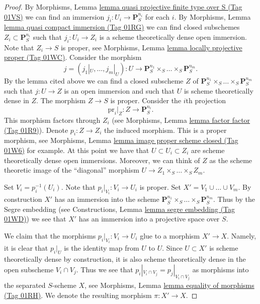 \documentclass{amsart}
\theoremstyle{plain}
\theoremstyle{definition}
\theoremstyle{remark}
\numberwithin{equation}{subsection}
\begin{document}
\begin{proof}
\medskip\noindent
By Morphisms, Lemma \href{https://stacks.math.columbia.edu/tag/01VS}{lemma quasi projective finite type over S (Tag 01VS)}
we can find an immersion $j_i : U_i \to \mathbf{P}_S^{n_i}$
for each $i$. By
Morphisms, Lemma \href{https://stacks.math.columbia.edu/tag/01RG}{lemma quasi compact immersion (Tag 01RG)} we can find
closed subschemes $Z_i \subset \mathbf{P}_S^{n_i}$
such that $j_i : U_i \to Z_i$ is a scheme theoretically
dense open immersion. Note that $Z_i \to S$ is proper, see
Morphisms, Lemma \href{https://stacks.math.columbia.edu/tag/01WC}{lemma locally projective proper (Tag 01WC)}.
Consider the morphism
$$
j = (j_1|_U, \ldots, j_m|_U) : U \longrightarrow
\mathbf{P}_S^{n_1} \times_S \ldots \times_S \mathbf{P}_S^{n_m}.
$$
By the lemma cited above we can find a closed subscheme
$Z$ of $\mathbf{P}_S^{n_1} \times_S \ldots \times_S \mathbf{P}_S^{n_m}$
such that $j : U \to Z$ is an open immersion and such that $U$
is scheme theoretically dense in $Z$. The morphism $Z \to S$
is proper. Consider the $i$th projection
$$
\text{pr}_i|_Z : Z \longrightarrow \mathbf{P}^{n_i}_S.
$$
This morphism factors through $Z_i$ (see Morphisms,
Lemma \href{https://stacks.math.columbia.edu/tag/01R9}{lemma factor factor (Tag 01R9)}). Denote $p_i : Z \to Z_i$
the induced morphism. This is a proper morphism, see
Morphisms, Lemma \href{https://stacks.math.columbia.edu/tag/01W6}{lemma image proper scheme closed (Tag 01W6)}
for example. At this point we have that
$U \subset U_i \subset Z_i$ are scheme theoretically
dense open immersions. Moreover, we can think of $Z$ as the
scheme theoretic image of the ``diagonal'' morphism
$U \to Z_1 \times_S \ldots \times_S Z_m$.

\medskip\noindent
Set $V_i = p_i^{-1}(U_i)$. Note that $p_i|_{V_i} : V_i \to U_i$ is proper.
Set $X' = V_1 \cup \ldots \cup V_m$. By construction $X'$ has an immersion
into the scheme
$\mathbf{P}^{n_1}_S \times_S \ldots \times_S \mathbf{P}^{n_m}_S$.
Thus by the Segre embedding (see
Constructions, Lemma \href{https://stacks.math.columbia.edu/tag/01WD}{lemma segre embedding (Tag 01WD)})
we see that $X'$ has
an immersion into a projective space over $S$.

\medskip\noindent
We claim that the morphisms $p_i|_{V_i}: V_i \to U_i$ glue to a morphism
$X' \to X$. Namely, it is clear that $p_i|_U$ is the identity map
from $U$ to $U$. Since $U \subset X'$ is scheme theoretically
dense by construction, it is also scheme theoretically dense
in the open subscheme $V_i \cap V_j$. Thus we see that
$p_i|_{V_i \cap V_j} = p_j|_{V_i \cap V_j}$ as morphisms into the
separated $S$-scheme $X$, see
Morphisms, Lemma \href{https://stacks.math.columbia.edu/tag/01RH}{lemma equality of morphisms (Tag 01RH)}.
We denote the resulting morphism $\pi : X' \to X$.


\end{proof}
\end{document}
